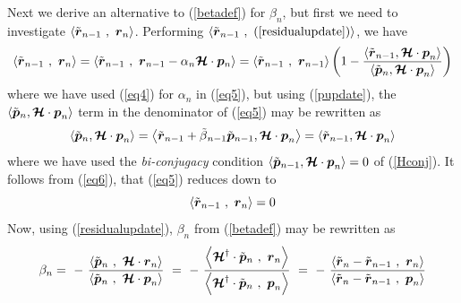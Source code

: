 Next we derive an alternative to (\ref{betadef}) for ${ \beta }_{n}$,
but first  we need to investigate
$\left\langle{ \tilde{\bmi  r}{}_{n-1}\ ,\ {\bmi   r}_{ n} }\right\rangle$.
Performing $\left\langle \tilde{\bmi  r}{}_{n-1}\ ,\ 
(\ref{residualupdate}) \right\rangle$, we have
\begin{equation} \label{eq5}
\left\langle{ \tilde{\bmi  r}{}_{n-1}\ ,\ {\bmi   r}_{ n} }\right\rangle=
\left\langle{ \tilde{\bmi  r}{}_{n-1}\ ,\ 
{{ \bmi   r}}_{n-1}  - \alpha{}_n {\CB H} \cdot  {\bmi  p}{}_{  n} 
}\right\rangle
=\left\langle{ \tilde{\bmi  r}{}_{n-1}\ ,\ {\bmi   r}_{ n-1} }\right\rangle
\left(1-
{\frac{\left\langle{\tilde{\bmi  r}{}_{n-1},{\CB H}\cdot{\bmi  
p}_{n}}\right\rangle}{\left\langle{\tilde{\bmi  p}{}_{n},{\CB H}
\cdot   {\bmi  p}_{n}}\right\rangle}}
\right)
\end{equation}
where we have used (\ref{eq4}) for ${{ \alpha }}_{n}$ in (\ref{eq5}), but
using (\ref{pupdate}), the $\left\langle{\tilde{\mbox{\boldmath$\mit p$\unboldmath}}{}_{n},{\mbox{\boldmath$\cal H$\unboldmath}}
\cdot   {\mbox{\boldmath$\mit p$\unboldmath}}_{n}}\right\rangle$ term in the denominator of 
(\ref{eq5}) may be rewritten as
\begin{equation} \label{eq6}
\left\langle{\tilde{\mbox{\boldmath$\mit p$\unboldmath}}{}_{n},{\mbox{\boldmath$\cal H$\unboldmath}}\cdot   {\mbox{\boldmath$\mit p$\unboldmath}}_{n}}\right\rangle=
\left\langle{\tilde{\mbox{\boldmath$\mit r$\unboldmath}}{}_{n-1} + 
\tilde{\beta}{}_{n-1} \tilde{\mbox{\boldmath$\mit p$\unboldmath}}{}_{n-1},{\mbox{\boldmath$\cal H$\unboldmath}}\cdot {\mbox{\boldmath$\mit p$\unboldmath}}_{n}}\right\rangle
=\left\langle{\tilde{\mbox{\boldmath$\mit r$\unboldmath}}{}_{n-1},{\mbox{\boldmath$\cal H$\unboldmath}}\cdot {\mbox{\boldmath$\mit p$\unboldmath}}_{n}}\right\rangle
\end{equation}
where we have used the {\em bi-conjugacy\/} condition 
$\left\langle{\tilde{\mbox{\boldmath$\mit p$\unboldmath}}{}_{n-1},{\mbox{\boldmath$\cal H$\unboldmath}}\cdot {\mbox{\boldmath$\mit p$\unboldmath}}_{n}}\right\rangle=0$ of (\ref{Hconj}). It follows from (\ref{eq6}), 
that (\ref{eq5}) reduces down to
\begin{equation} \label{eq7}
\left\langle{ \tilde{\mbox{\boldmath$\mit r$\unboldmath}}{}_{n-1}\ ,\ {\mbox{\boldmath$\mit r$\unboldmath}}_{ n} }\right\rangle=0
\end{equation}
Now, using (\ref{residualupdate}),  ${ \beta }_{n}$ from (\ref{betadef}) 
may be rewritten as
\begin{equation} \label{betadef1}
{ \beta }_{n} =\ -\ {\frac{\left\langle{ \tilde{\bmi  p}{}_{n}\ ,
\ {\CB H}\cdot {\bmi   r}_{ n}}\right\rangle}
{\left\langle{\tilde{\bmi  p}{}_{n}\ ,\ {\CB H} \cdot 
{\bmi   p}_{ n}}\right\rangle}}
\ = \ -\ {\frac{\left\langle{{\CB H}^{\dagger}\cdot \tilde{\bmi  p}{}_{n}\ 
,
\  {\bmi   r}_{ n}}\right\rangle}
{\left\langle{{\CB H}^{\dagger}\cdot\tilde{\bmi  p}{}_{n}\ ,\  
{\bmi   p}_{ n}}\right\rangle}}
\ = \ -\ {\frac{\left\langle{{\tilde{ \bmi   r}}_{n}-{\tilde{ \bmi   
r}}_{n-1}\ ,
\  {\bmi   r}_{ n}}\right\rangle}
{\left\langle{{\tilde{ \bmi   r}}_{n}-{\tilde{ \bmi   r}}_{n-1}\ ,\  
{\bmi   p}_{ n}}\right\rangle}}
\end{equation}
